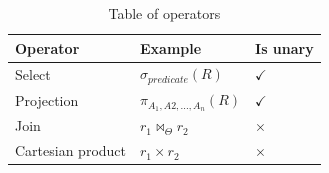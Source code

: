 \begin{table}[h]
    \centering
    \begin{tabular}{|lll|}
    \hline 
    \multicolumn{1}{|l|}{\textbf{Operator}}          & \multicolumn{1}{l|}{\textbf{Example}}   & \multicolumn{1}{l|}{\textbf{Is unary}}      \\ \hline
    \multicolumn{1}{|l|}{Select}                     & \multicolumn{1}{l|}{$\sigma_{predicate}(R)$}             & \multicolumn{1}{l|}{$\checkmark$}           \\ \hline
    \multicolumn{1}{|l|}{Projection}                 & \multicolumn{1}{l|}{$\pi_{A_1, A2,...,A_n}(R)$}             & \multicolumn{1}{l|}{$\checkmark$}           \\ \hline
    \multicolumn{1}{|l|}{Join}                 & \multicolumn{1}{l|}{$r_1 \Join_\Theta r_2$}             & \multicolumn{1}{l|}{$\times$}           \\ \hline
    \multicolumn{1}{|l|}{Cartesian product}          & \multicolumn{1}{l|}{$r_1\times r_2$}              & \multicolumn{1}{l|}{$\times$}            \\ \hline
    \end{tabular}
    \caption{Table of operators}
    \label{Relational algebra operators}
\end{table}

